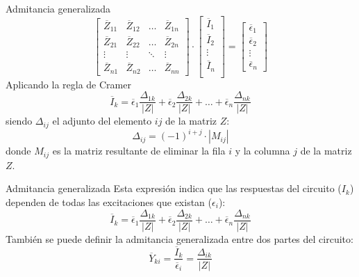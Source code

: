\documentclass[aspectratio=169, usenames,svgnames,dvipsnames]{beamer}
\begin{document}
\begin{frame}[label={sec:orgf9a0999}]{Admitancia generalizada}
\begin{equation*}
  \begin{bmatrix}
    \overline{Z}_{11} & \overline{Z}_{12} & \dots & \overline{Z}_{1n} \\
    \overline{Z}_{21} & \overline{Z}_{22} & \dots & \overline{Z}_{2n} \\
    \vdots & \vdots & \ddots & \vdots \\
    \overline{Z}_{n1} & \overline{Z}_{n2} &  \dots & \overline{Z}_{nn}
  \end{bmatrix} \cdot %
  \begin{bmatrix}
    \overline{I}_1\\
    \overline{I}_2\\
    \vdots \\
    \overline{I}_n\\
  \end{bmatrix} = %
  \begin{bmatrix}
    \overline{\epsilon}_1\\
    \overline{\epsilon}_2\\
    \vdots \\
    \overline{\epsilon}_n
  \end{bmatrix}
\end{equation*}
Aplicando la regla de Cramer
\[
  \overline{I}_k = \overline{\epsilon}_1 \frac{\Delta_{1k}}{|Z|} + \overline{\epsilon}_2 \frac{\Delta_{2k}}{|Z|} + \dots + \overline{\epsilon}_n \frac{\Delta_{nk}}{|Z|}
\]
siendo \(\Delta_{ij}\) el adjunto del elemento \(ij\) de la matriz \(Z\):
\[
  \Delta_{ij} = (-1)^{i+j} \cdot |M_{ij}|
\]
donde \(M_{ij}\) es la matriz resultante de eliminar la fila \(i\) y la columna \(j\) de la matriz \(Z\).
\end{frame}

\begin{frame}[label={sec:orga294e64}]{Admitancia generalizada}
Esta expresión indica que las respuestas del circuito (\(I_k\)) dependen de todas las excitaciones que existan (\(\epsilon_i\)):
\[
  \overline{I}_k = \overline{\epsilon}_1 \frac{\Delta_{1k}}{|Z|} + \overline{\epsilon}_2 \frac{\Delta_{2k}}{|Z|} + \dots + \overline{\epsilon}_n \frac{\Delta_{nk}}{|Z|}
\]
También se puede definir la admitancia generalizada entre dos partes del circuito:
\[
  \overline{Y}_{ki} = \frac{\overline{I}_k}{\overline{\epsilon}_i} = \frac{\Delta_{ik}}{|Z|}
\]
\end{frame}
\end{document}
